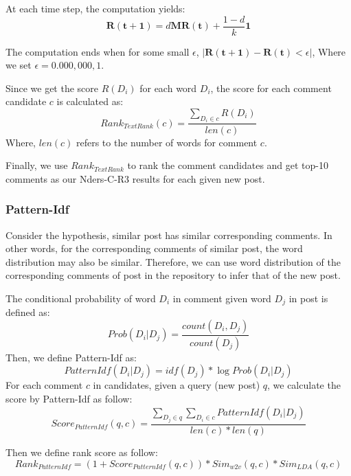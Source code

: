 \documentclass{llncs}
\begin{document}
At each time step, the computation yields:
\begin{equation}
  \bm{R(t+1)} = d\bm{M}\bm{R(t)} + \frac{1-d}{k} \bm{1}
\end{equation}

The computation ends when for some small $\epsilon$, $|\bm{R(t+1)} - \bm{R(t)} < \epsilon|$, Where we set $\epsilon = 0.000,000,1$.

Since we get the score $R(D_i)$ for each word $D_i$, the score for each comment candidate $c$ is calculated as:
\begin{equation}
  Rank_{TextRank}(c) = \frac{\sum_{D_i \in c}{R(D_i)}}{len(c)} 
\end{equation}
Where, $len(c)$ refers to the number of words for comment $c$.

Finally, we use $Rank_{TextRank}$ to rank the comment candidates and get top-10 comments as our Nders-C-R3 results for each given new post.

\subsubsection{Pattern-Idf}
Consider the hypothesis, similar post has similar corresponding comments. In other words, for the corresponding comments of similar post, the word distribution may also be similar. Therefore, we can use word distribution of the corresponding comments of post in the repository to infer that of the new post.

The conditional probability of word $D_i$ in comment given word $D_j$ in post is defined as:
\begin{equation}
  Prob(D_i|D_j) = \frac{count(D_i, D_j)}{count(D_j)}
\end{equation}
Then, we define Pattern-Idf as:
\begin{equation}
  PatternIdf(D_i|D_j) = idf(D_j) * \log{Prob(D_i|D_j)}
\end{equation}
For each comment $c$ in candidates, given a query (new post) $q$, we calculate the score by Pattern-Idf as follow:
\begin{equation}
  Score_{PatternIdf}(q, c) = \frac{\sum_{D_j \in q}{\sum_{D_i \in c}{PatternIdf(D_i|D_j)}}}{len(c) * len(q)}
\end{equation}

Then we define rank score as follow:
\begin{equation}
  Rank_{PatternIdf} = (1 + Score_{PatternIdf}(q, c)) * Sim_{w2v}(q, c)*Sim_{LDA}(q, c)  
\end{equation}
\end{document}
